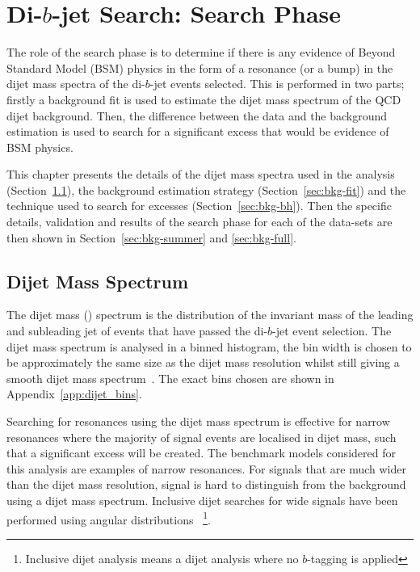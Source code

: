 \chapter{Di-$b$-jet Search: Search Phase}
\label{sec:bkg}

The role of the search phase is to determine if there is any evidence of Beyond Standard Model (BSM)
physics in the form of a resonance (or a bump) in the dijet mass spectra of the di-$b$-jet events selected.
This is performed in two parts; firstly a background fit is used to estimate
the dijet mass spectrum of the QCD dijet background.
Then, the difference between the data and the background estimation is used 
to search for a significant excess that would be evidence of BSM physics.

This chapter presents
the details of the dijet mass  spectra used in the analysis (Section~\ref{sec:bkg-mjj}),
the background estimation strategy (Section~\ref{sec:bkg-fit}) and
the technique used to search for excesses (Section~\ref{sec:bkg-bh}).
Then the specific details, validation and results of the search phase for each of the data-sets are
then shown in Section~\ref{sec:bkg-summer} and \ref{sec:bkg-full}.

\section{Dijet Mass Spectrum}
\label{sec:bkg-mjj}

The dijet mass (\mjj) spectrum
is the distribution of the invariant mass of the leading and subleading jet
of events that have passed the di-$b$-jet event selection.
The dijet mass spectrum is analysed in a binned histogram,
the bin width is chosen to be approximately the same size as the dijet mass resolution
whilst still giving a smooth dijet mass spectrum~\cite{dijet-mori16_paper}.
The exact bins chosen are shown in Appendix~\ref{app:dijet_bins}.

Searching for resonances using the dijet mass spectrum is effective
for narrow resonances where the majority of signal events are localised in dijet mass,
such that a significant excess will be created.
The benchmark models considered for this analysis are examples of narrow resonances.
For signals that are much wider than the dijet mass resolution,
signal is hard to distinguish from the background using a dijet mass spectrum.
Inclusive dijet searches for wide signals have been performed using angular distributions~\cite{dijet-mori16_paper}
\footnote{Inclusive dijet analysis means a dijet analysis where no $b$-tagging is applied}.

